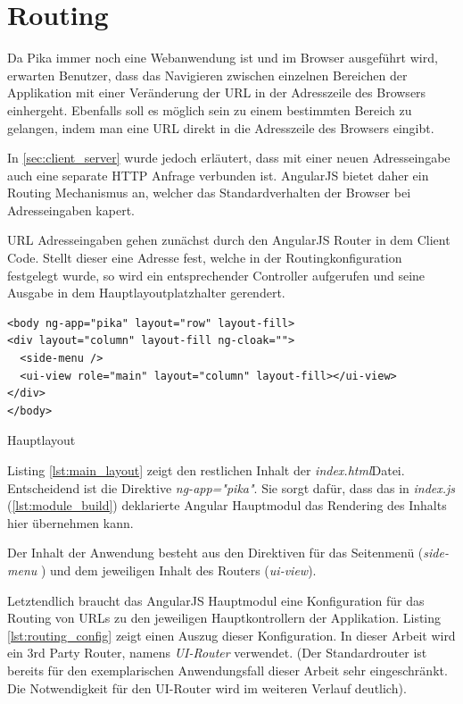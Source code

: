 \section{Routing}
\label{sec:routing}

Da Pika immer noch eine Webanwendung ist und im Browser ausgeführt wird, erwarten Benutzer, dass das Navigieren zwischen einzelnen Bereichen der Applikation mit einer Veränderung der URL in der Adresszeile des Browsers einhergeht. Ebenfalls soll es möglich sein zu einem bestimmten Bereich zu gelangen, indem man eine URL direkt in die Adresszeile des Browsers eingibt.

In \ref{sec:client_server} wurde jedoch erläutert, dass mit einer neuen Adresseingabe auch eine separate HTTP Anfrage verbunden ist. AngularJS bietet daher ein Routing Mechanismus an, welcher das Standardverhalten der Browser bei Adresseingaben kapert. 

URL Adresseingaben gehen zunächst durch den AngularJS Router in dem Client Code. Stellt dieser eine Adresse fest, welche in der Routingkonfiguration festgelegt wurde, so wird ein entsprechender Controller aufgerufen und seine Ausgabe in dem Hauptlayoutplatzhalter gerendert. 


\begin{listing}[H]
\begin{verbatim}
<body ng-app="pika" layout="row" layout-fill>
<div layout="column" layout-fill ng-cloak="">
  <side-menu />
  <ui-view role="main" layout="column" layout-fill></ui-view>
</div>
</body>
\end{verbatim}
\caption{Hauptlayout}
\label{lst:main_layout}
\end{listing}

Listing \ref{lst:main_layout} zeigt den restlichen Inhalt der \textit{index.html}Datei. Entscheidend ist die Direktive \textit{ng-app="pika"}. Sie sorgt dafür, dass das in \textit{index.js} (\ref{lst:module_build}) deklarierte Angular Hauptmodul das Rendering des Inhalts hier übernehmen kann.

Der Inhalt der Anwendung besteht aus den Direktiven für das Seitenmenü (\textit{side-menu} ) und dem jeweiligen Inhalt des Routers (\textit{ui-view}). 

Letztendlich braucht das AngularJS Hauptmodul eine Konfiguration für das Routing von URLs zu den jeweiligen Hauptkontrollern der Applikation. Listing \ref{lst:routing_config} zeigt einen Auszug dieser Konfiguration. In dieser Arbeit wird ein 3rd Party Router, namens \textit{UI-Router} verwendet. (Der Standardrouter ist bereits für den exemplarischen Anwendungsfall dieser Arbeit sehr eingeschränkt. Die Notwendigkeit für den UI-Router wird im weiteren Verlauf deutlich).

